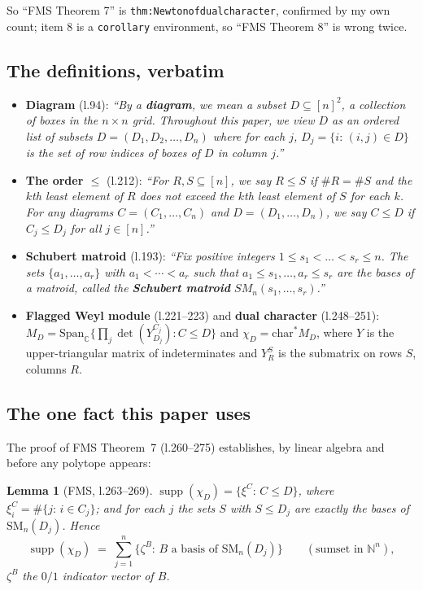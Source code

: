 \documentclass[11pt]{article}
\newtheorem{lem}[thm]{Lemma}
\theoremstyle{definition}
\DeclareMathOperator{\supp}{supp}
\newcommand{\N}{\mathbb{N}}
\newcommand{\SM}{\mathrm{SM}}
\begin{document}
So ``FMS Theorem 7'' is \texttt{thm:Newtonofdualcharacter}, confirmed by my own count; item 8 is
a \texttt{corollary} environment, so ``FMS Theorem 8'' is wrong twice.

\subsection{The definitions, verbatim}

\begin{itemize}
\item \textbf{Diagram} (l.94): \emph{``By a \textbf{diagram}, we mean a subset $D\subseteq
[n]^2$, a collection of boxes in the $n\times n$ grid. Throughout this paper, we view $D$ as an
ordered list of subsets $D=(D_1,D_2,\ldots,D_n)$ where for each $j$, $D_j=\{i:\,(i,j)\in D\}$
is the set of row indices of boxes of $D$ in column $j$.''}

\item \textbf{The order $\le$} (l.212): \emph{``For $R,S\subseteq[n]$, we say $R\leq S$ if
$\#R=\#S$ and the $k$th least element of $R$ does not exceed the $k$th least element of $S$ for
each $k$. For any diagrams $C=(C_1,\ldots,C_n)$ and $D=(D_1,\ldots,D_n)$, we say $C\leq D$ if
$C_j\leq D_j$ for all $j\in[n]$.''}

\item \textbf{Schubert matroid} (l.193): \emph{``Fix positive integers $1\leq s_1<\ldots<s_r
\leq n$. The sets $\{a_1,\ldots,a_r\}$ with $a_1<\cdots<a_r$ such that $a_1\leq s_1,\ldots,
a_r\leq s_r$ are the bases of a matroid, called the \textbf{Schubert matroid}
$SM_n(s_1,\ldots,s_r)$.''}

\item \textbf{Flagged Weyl module} (l.221--223) and \textbf{dual character} (l.248--251):
$M_D=\mathrm{Span}_\mathbb{C}\{\prod_{j}\det(Y^{C_j}_{D_j}):C\le D\}$ and
$\chi_D=\mathrm{char}^*M_D$, where $Y$ is the upper-triangular matrix of indeterminates and
$Y^S_R$ is the submatrix on rows $S$, columns $R$.
\end{itemize}

\subsection{The one fact this paper uses}

The proof of FMS Theorem~7 (l.260--275) establishes, by linear algebra and before any polytope
appears:

\begin{lem}[FMS, l.263--269]\label{lem:supp}
$\supp(\chi_D)=\{\xi^C:\,C\le D\}$, where $\xi^C_i=\#\{j:\,i\in C_j\}$; and for each $j$ the
sets $S$ with $S\le D_j$ are exactly the bases of $\SM_n(D_j)$. Hence
\[
  \supp(\chi_D)\;=\;\sum_{j=1}^{n}\bigl\{\zeta^{B}:\,B\text{ a basis of }\SM_n(D_j)\bigr\}
  \qquad(\text{sumset in }\N^n),
\]
$\zeta^B$ the $0/1$ indicator vector of $B$.
\end{lem}
\end{document}
